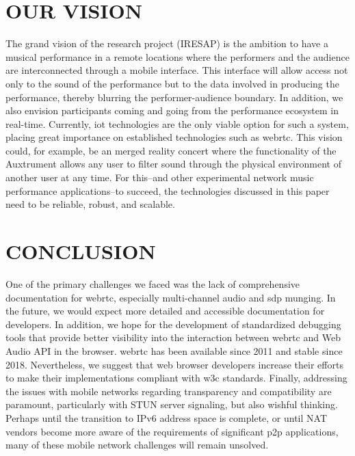 \documentclass[fleqn]{jaes}
\begin{document}
\section{OUR VISION}
The grand vision of the research project (IRESAP) is the ambition to have a musical performance in a remote locations where the performers and the audience are interconnected through a mobile interface. This interface will allow access not only to the sound of the performance but to the data involved in producing the performance, thereby blurring the performer-audience boundary. In addition, we also envision participants coming and going from the performance ecosystem in real-time. Currently, \gls{iot} technologies are the only viable option for such a system, placing great importance on established technologies such as \gls{webrtc}. This vision could, for example, be an merged reality concert where the functionality of the Auxtrument allows any user to filter sound through the physical environment of another user at any time. For this--and other experimental network music performance applications--to succeed, the technologies discussed in this paper need to be reliable, robust, and scalable.

% 



\section{CONCLUSION}
One of the primary challenges we faced was the lack of comprehensive documentation for \gls{webrtc}, especially multi-channel audio and \gls{sdp} munging. In the future, we would expect more detailed and accessible documentation for developers. In addition, we hope for the development of standardized debugging tools that provide better visibility into the interaction between \gls{webrtc} and Web Audio API in the browser. \gls{webrtc} has been available since 2011 and stable since 2018. Nevertheless, we suggest that web browser developers increase their efforts to make their implementations compliant with \gls{w3c} standards. Finally, addressing the issues with mobile networks regarding transparency and compatibility are paramount, particularly with STUN server signaling, but also wishful thinking. Perhaps until the transition to IPv6 address space is complete, or until NAT vendors become more aware of the requirements of significant \gls{p2p} applications, many of these mobile network challenges will remain unsolved.
\end{document}
